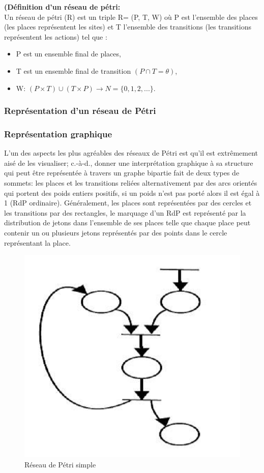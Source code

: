 \begin{defn}\textbf{\textbf{(Définition d'un réseau de pétri:}}
	\\
	Un réseau de pétri (R) est un triple R= (P, T, W) où P est l'ensemble des places (les places représentent les sites) et T l'ensemble des transitions (les transitions représentent les actions) tel que :
	
	\begin{itemize}
		\item  	P est un ensemble final de places,
		\item T est un ensemble final de transition $ (P \cap T = \theta ) $, 
		\item W: $(P \times T) \cup (T \times P)\to N = \{0,1,2,...\} $.  
	\end{itemize}
	
\end{defn}








\subsubsection{Représentation d'un réseau de Pétri }



\subsubsection*{Représentation graphique} 
L'un des aspects les plus agréables des réseaux de Pétri est qu'il est extrêmement aisé de les visualiser; c.-à-d., donner une interprétation graphique à sa structure qui peut être représentée à travers un graphe bipartie fait de deux types de sommets: les places et les transitions reliées alternativement par des arcs orientés qui portent des poids entiers positifs, si un poids n'est pas porté alors il est égal à 1 (RdP ordinaire). Généralement, les places sont représentées par des cercles et les transitions par des rectangles, le marquage d'un RdP est représenté par la distribution de jetons dans l'ensemble de ses places telle que chaque place peut contenir un ou plusieurs jetons représentés par des points dans le cercle représentant la place. \parencite{Rdp}



\begin{figure}[h]
	\centering
	\includegraphics[width=0.5\linewidth]{images/petrif01}
	\caption{ Réseau de Pétri simple }
	\label{fig:petrif01}
\end{figure}
